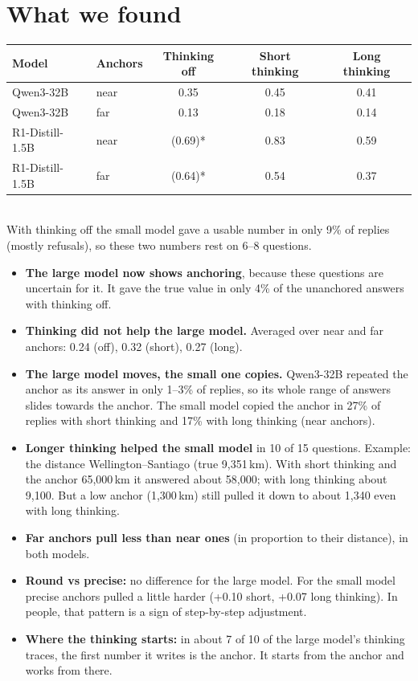 \documentclass[11pt,a4paper]{article}
\begin{document}
\section*{What we found}
\begin{center}\small
\begin{tabular}{@{}llccc@{}}
\toprule
Model & Anchors & Thinking off & Short thinking & Long thinking \\
\midrule
Qwen3-32B & near & 0.35 & 0.45 & 0.41 \\
Qwen3-32B & far & 0.13 & 0.18 & 0.14 \\
R1-Distill-1.5B & near & (0.69)* & 0.83 & 0.59 \\
R1-Distill-1.5B & far & (0.64)* & 0.54 & 0.37 \\
\bottomrule
\end{tabular}\\[2pt]
{\footnotesize *With thinking off the small model gave a usable number in only 9\% of replies (mostly refusals), so these two numbers rest on 6--8 questions.}
\end{center}
\begin{itemize}[leftmargin=*]
  \item \textbf{The large model now shows anchoring}, because these questions are uncertain for it. It gave the true value in only 4\% of the unanchored answers with thinking off.
  \item \textbf{Thinking did not help the large model.} Averaged over near and far anchors: 0.24 (off), 0.32 (short), 0.27 (long).
  \item \textbf{The large model moves, the small one copies.} Qwen3-32B repeated the anchor as its answer in only 1--3\% of replies, so its whole range of answers slides towards the anchor. The small model copied the anchor in 27\% of replies with short thinking and 17\% with long thinking (near anchors).
  \item \textbf{Longer thinking helped the small model} in 10 of 15 questions. Example: the distance Wellington--Santiago (true 9,351\,km). With short thinking and the anchor 65,000\,km it answered about 58,000; with long thinking about 9,100. But a low anchor (1,300\,km) still pulled it down to about 1,340 even with long thinking.
  \item \textbf{Far anchors pull less than near ones} (in proportion to their distance), in both models.
  \item \textbf{Round vs precise:} no difference for the large model. For the small model precise anchors pulled a little harder (+0.10 short, +0.07 long thinking). In people, that pattern is a sign of step-by-step adjustment.
  \item \textbf{Where the thinking starts:} in about 7 of 10 of the large model's thinking traces, the first number it writes is the anchor. It starts from the anchor and works from there.
\end{itemize}
\end{document}
